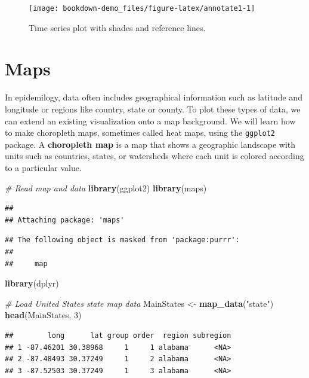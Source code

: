 \documentclass[]{book}
\newenvironment{Shaded}{\begin{snugshade}}{\end{snugshade}}
\newcommand{\KeywordTok}[1]{\textcolor[rgb]{0.13,0.29,0.53}{\textbf{#1}}}
\newcommand{\DecValTok}[1]{\textcolor[rgb]{0.00,0.00,0.81}{#1}}
\newcommand{\StringTok}[1]{\textcolor[rgb]{0.31,0.60,0.02}{#1}}
\newcommand{\CommentTok}[1]{\textcolor[rgb]{0.56,0.35,0.01}{\textit{#1}}}
\newcommand{\NormalTok}[1]{#1}
\begin{document}
\begin{figure}

{\centering \texttt{[image: bookdown-demo\_files/figure-latex/annotate1-1]} 

}

\caption{Time series plot with shades and reference lines.}\label{fig:annotate1}
\end{figure}

\section{Maps}\label{maps}

In epidemilogy, data often includes geographical information such as
latitude and longitude or regions like country, state or county. To plot
these types of data, we can extend an existing visualization onto a map
background. We will learn how to make choropleth maps, sometimes called
heat maps, using the \texttt{ggplot2} package. A \textbf{choropleth map}
is a map that shows a geographic landscape with units such as countries,
states, or watersheds where each unit is colored according to a
particular value.

\begin{Shaded}
\begin{Highlighting}[]
\CommentTok{# Read map and data}
\KeywordTok{library}\NormalTok{(ggplot2)}
\KeywordTok{library}\NormalTok{(maps)}
\end{Highlighting}
\end{Shaded}

\begin{verbatim}
## 
## Attaching package: 'maps'
\end{verbatim}

\begin{verbatim}
## The following object is masked from 'package:purrr':
## 
##     map
\end{verbatim}

\begin{Shaded}
\begin{Highlighting}[]
\KeywordTok{library}\NormalTok{(dplyr)}

\CommentTok{# Load United States state map data}
\NormalTok{MainStates <-}\StringTok{ }\KeywordTok{map_data}\NormalTok{(}\StringTok{"state"}\NormalTok{)}
\KeywordTok{head}\NormalTok{(MainStates, }\DecValTok{3}\NormalTok{)}
\end{Highlighting}
\end{Shaded}

\begin{verbatim}
##        long      lat group order  region subregion
## 1 -87.46201 30.38968     1     1 alabama      <NA>
## 2 -87.48493 30.37249     1     2 alabama      <NA>
## 3 -87.52503 30.37249     1     3 alabama      <NA>
\end{verbatim}
\end{document}
